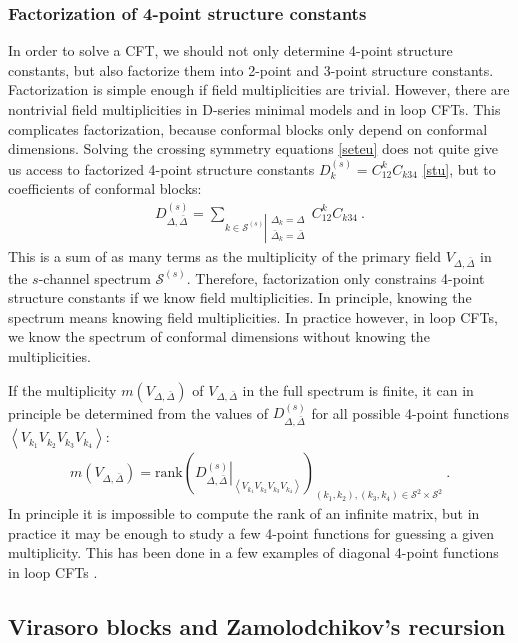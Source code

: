 \documentclass[12pt, a4paper]{article}
\theoremstyle{break}
\begin{document}
\subsubsection{Factorization of 4-point structure constants}

In order to solve a CFT, we should not only determine 4-point structure constants, but also factorize them into 2-point and 3-point structure constants. Factorization is simple enough if field multiplicities are trivial. However, there are nontrivial field multiplicities in D-series minimal models and in loop CFTs. 
This complicates factorization, because conformal blocks only depend on conformal dimensions. Solving the crossing symmetry equations \eqref{seteu} does not quite give us access to factorized 4-point structure constants $D^{(s)}_k = C^k_{12}C_{k34}$ \eqref{stu}, but to coefficients of conformal blocks:
\begin{align}
 D^{(s)}_{\Delta,\bar\Delta} = \sum_{k\in\mathcal{S}^{(s)}\left|\substack{\Delta_k=\Delta\\ \bar{\Delta}_k=\bar\Delta}\right.} C^k_{12}C_{k34} \ .
 \label{dcc}
\end{align}
This is a sum of as many terms as the multiplicity of the primary field $V_{\Delta,\bar\Delta}$ in the $s$-channel spectrum $\mathcal{S}^{(s)}$. Therefore, factorization only constrains 4-point structure constants if we know field multiplicities. In principle, knowing the spectrum means knowing field multiplicities. In practice however, in loop CFTs, we know the spectrum of conformal dimensions without knowing the multiplicities. 

If the multiplicity $m(V_{\Delta,\bar\Delta})$ of $V_{\Delta,\bar\Delta}$ in the full spectrum is finite, it can in principle be determined from the values of $D^{(s)}_{\Delta,\bar\Delta}$ for all possible 4-point functions $\left<V_{k_1}V_{k_2}V_{k_3}V_{k_4}\right>$: 
\begin{align}
 m\left(V_{\Delta,\bar\Delta}\right) = \text{rank}\left(\left.D^{(s)}_{\Delta,\bar\Delta}\right|_{\left<V_{k_1}V_{k_2}V_{k_3}V_{k_4}\right>}\right)_{(k_1,k_2),(k_3,k_4)\in\mathcal{S}^2\times \mathcal{S}^2}\ .
\end{align}
In principle it is impossible to compute the rank of an infinite matrix, but 
in practice it may be enough to study a few 4-point functions for guessing a given multiplicity. This has been done in a few examples of diagonal 4-point functions in loop CFTs \cite{rib22}.


\subsection{Virasoro blocks and Zamolodchikov's recursion}
\end{document}
